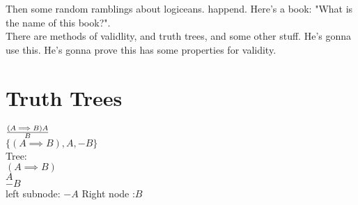 Then some random ramblings about logiceans. happend. Here's a book: "What is the name of this book?".\\
There are methods of validlity, and truth trees, and some other stuff. He's gonna use this. He's gonna prove this has some properties for validity. \\

\section{Truth Trees}
$\frac{(A \implies B) \\ A}{B}$ \\
$\{ ( A \implies B) , A , -B \}$ \\
Tree: \\
$(A \implies B)$ \\
$A$ \\
$-B$ \\
left subnode: $-A$
Right node :$B$



